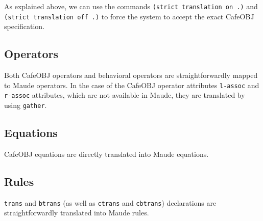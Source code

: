As explained above, we can use the commands \verb"(strict translation on .)" and
\texttt{(strict translation off .)} to force the system to accept the exact CafeOBJ
specification.


\subsection{Operators}

Both CafeOBJ operators and behavioral operators are straightforwardly mapped to
Maude operators. In the case of the CafeOBJ operator attributes \verb"l-assoc"
and \verb"r-assoc" attributes, which are not available in Maude, they are
translated by using \verb"gather".

\subsection{Equations}

CafeOBJ equations are directly translated into Maude equations.

\subsection{Rules}

\verb"trans" and \verb"btrans" (as well as \verb"ctrans" and \verb"cbtrans") declarations are
straightforwardly translated into Maude rules.

